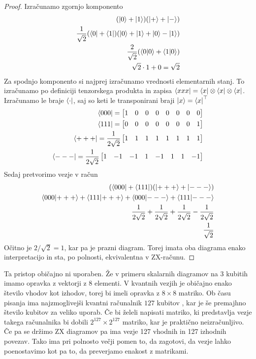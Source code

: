 \documentclass[mat1]{fmfdelo}
\newcommand{\tranp}{\top}
\begin{document}
\begin{proof}
    Izračunamo zgornjo komponento
    \begin{align*}
        (\ket0 + \ket 1)(\ket{+}+\ket{-})\\
        \frac{1}{\sqrt2}(\bra0 + \bra 1)(\ket{0}+\ket{1}+\ket0-\ket1)\\
        \frac{2}{\sqrt2}(\braket{0}{0}+\braket{1}{0})\\
        \sqrt{2}\cdot 1 + 0 = \sqrt2
    \end{align*}
    Za spodnjo komponento si najprej izračunamo vrednosti elementarnih stanj. To izračunamo po definiciji tenzorskega produkta in zapisa \(\bra{xxx} = \bra{x}\otimes \bra{x}\otimes \bra{x}\). Izračunamo le braje \(\bra{\cdot}\), saj so keti le transponirani braji \(\ket{x}=\bra{x}^\tranp\)
    \begin{align*}
        \bra{000} = \begin{bmatrix}
            1&0&0&0& 0&0&0&0
        \end{bmatrix}\\
        \bra{111} = \begin{bmatrix}
            0&0&0&0& 0&0&0&1
        \end{bmatrix}\\
        \bra{+++} = \frac{1}{2\sqrt{2}}\begin{bmatrix}
            1&1&1&1& 1&1&1&1
        \end{bmatrix}\\
        \bra{---} = \frac{1}{2\sqrt{2}} \begin{bmatrix}
            1&-1&-1&1& -1&1&1&-1
        \end{bmatrix}
    \end{align*}
    Sedaj pretvorimo vezje v račun
    \begin{align*}
        (\bra{000}+\bra{111})(\ket{+++}+\ket{---})\\
        \braket{000}{+++}+\braket{111}{+++}+\braket{000}{---}+\braket{111}{---}\\
        \frac{1}{2\sqrt2}+\frac{1}{2\sqrt2}+\frac{1}{2\sqrt2}-\frac{1}{2\sqrt2}\\
        \frac{1}{\sqrt2}
    \end{align*}
    Očitno je \(2/\sqrt2 = 1\), kar pa je prazni diagram. Torej imata oba diagrama enako interpretacijo in sta, po polnosti, ekvivalentna v ZX-računu.
\end{proof}
Ta pristop običajno ni uporaben. Že v primeru skalarnih diagramov na 3 kubitih imamo opravka z vektorji z 8 elementi. V kvantnih vezjih je običajno enako število vhodov kot izhodov, torej bi imeli opravka z \(8\times8\) matriko. Ob času pisanja ima najzmoglivejši kvantni računalnik \(127\) kubitov \cite{hugh}, kar je še premajhno število kubitov za veliko uporab. Če bi želeli napisati matriko, ki predstavlja vezje takega računalnika bi dobili \(2^{127}\times 2^{127}\) matriko, kar je praktično neizračunljivo. Če pa se držimo ZX diagramov pa ima vezje 127 vhodnih in 127 izhodnih povezav. Tako ima pri polnosto večji pomen to, da zagotovi, da vezje lahko poenostavimo kot pa to, da preverjamo enakost z matrikami.
\end{document}
